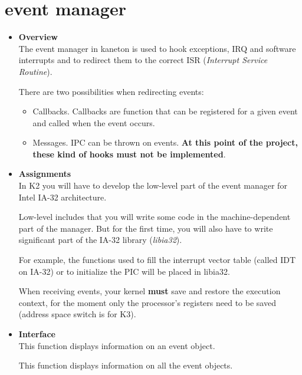 \section{\textbf{event} manager}

\begin{itemize}
  \item {\bf Overview}\\

    The event manager in kaneton is used to hook exceptions, IRQ and
    software interrupts and to redirect them to the correct ISR
    (\emph{Interrupt Service Routine}).

    There are two possibilities when redirecting events:
    \begin{itemize}
      \item
	Callbacks. Callbacks are function that can be registered for a
	given event and called when the event occurs.
      \item
	Messages. IPC can be thrown on events. \textbf{At this point
	of the project, these kind of hooks must not be implemented}.
    \end{itemize}

  \item {\bf Assignments}\\

    In K2 you will have to develop the low-level part of the event
    manager for Intel IA-32 architecture.

    Low-level includes that you will write some code in the
    machine-dependent part of the manager. But for the first time, you
    will also have to write significant part of the IA-32 library
    (\emph{libia32}).

    For example, the functions used to fill the interrupt vector table
    (called IDT on IA-32) or to initialize the PIC will be placed in
    libia32.

    When receiving events, your kernel \textbf{must} save and restore
    the execution context, for the moment only the processor's
    registers need to be saved (address space switch is for K3).

  \item {\bf Interface}\\

	 {
	   This function displays information on an event object.
	 }

	 {
	   This function displays information on all the event objects.
	 }


\end{itemize}

